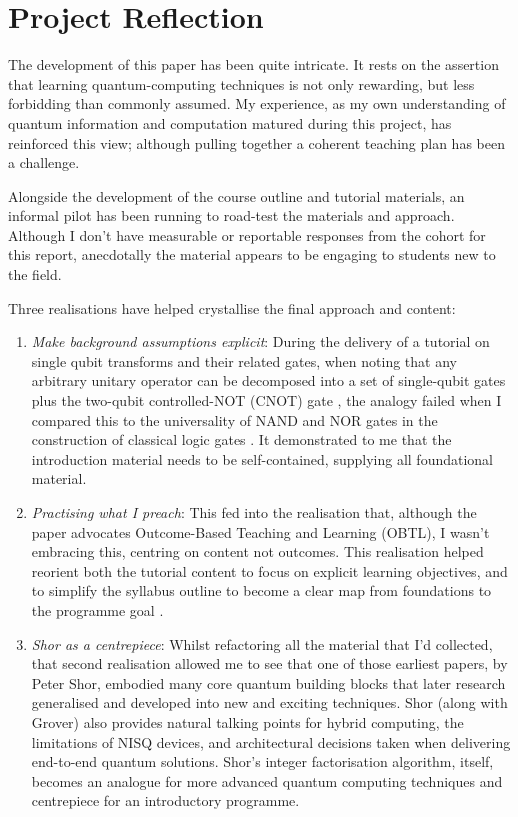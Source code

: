 \section{Project Reflection}

The development of this paper has been quite intricate.  
It rests on the assertion that learning quantum-computing techniques 
is not only rewarding, but less forbidding than commonly assumed.
My experience, as my own understanding of quantum information and computation matured during this project, 
has reinforced this view; although pulling together a coherent teaching plan has been a challenge.

Alongside the development of the course outline and tutorial materials, 
an informal pilot has been running to road-test the materials and approach. 
Although I don't have measurable or reportable responses from the cohort for this report, 
anecdotally the material appears to be engaging to students new to the field.

Three realisations have helped crystallise the final approach and content:
\begin{enumerate}
\item \emph{Make background assumptions explicit}: 
During the delivery of a tutorial on single qubit transforms and their related gates,
when noting that any arbitrary unitary operator can be decomposed 
into a set of single-qubit gates plus the two-qubit controlled-NOT (CNOT) gate \cite{Nielsen:2010},
the analogy failed when I compared this to the universality of NAND and NOR gates 
in the construction of classical logic gates \cite{Wikipedia:UniversalLogicGates}.
It demonstrated to me that the introduction material needs to be self-contained,
supplying all foundational material.

\item \emph{Practising what I preach}: This fed into the realisation that, 
although the paper advocates Outcome-Based Teaching and Learning (OBTL), 
I wasn't embracing this, centring on content not outcomes.  
This realisation helped reorient both the tutorial content to focus on explicit learning objectives,
and to simplify the syllabus outline to become a clear map from foundations to the programme goal \cite{Wong:2011}.

\item \emph{Shor as a centrepiece}: Whilst refactoring all the material that I'd collected, 
that second realisation allowed me to see that one of those earliest papers, by Peter Shor, 
embodied many core quantum building blocks that later research generalised and developed into new and exciting techniques. 
Shor (along with Grover) also provides natural talking points for hybrid computing, the limitations of NISQ devices, 
and architectural decisions taken when delivering end-to-end quantum solutions.  
Shor's integer factorisation algorithm, itself, becomes an analogue for more advanced quantum computing techniques
and centrepiece for an introductory programme.
\end{enumerate}
